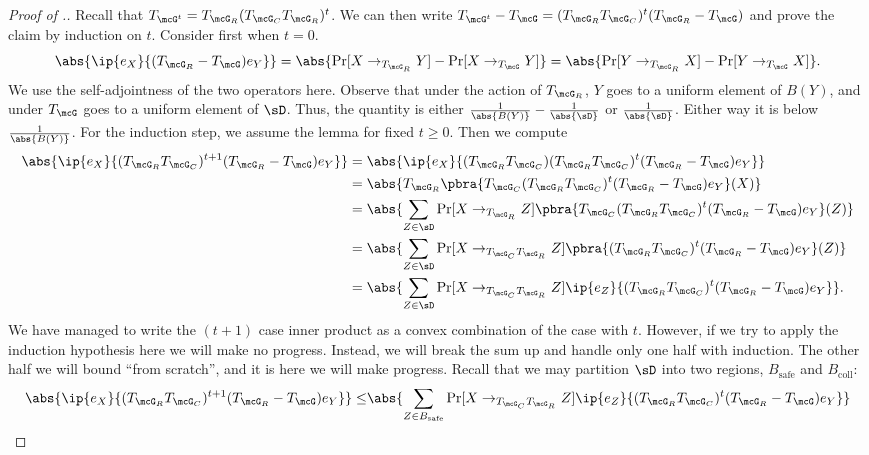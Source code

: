 \begin{proof}[Proof of .]
Recall that $T_{\mcG^t} = T_{\mcG_R}(T_{\mcG_C}T_{\mcG_R})^t$. We can then write $T_{\mcG^t}-T_{\mcG} = (T_{\mcG_R}T_{\mcG_C})^t(T_{\mcG_R} - T_\mcG)$ and prove the claim by induction on $t$. Consider first when $t = 0$.
\begin{equation*}
    \abs{\ip{e_X}{(T_{\mcG_R}-T_{\mcG}) e_Y}} = \abs{\Pr[X \to_{T_{\mcG_R}} Y] - \Pr[X \to_{T_{\mcG}} Y]} = \abs{\Pr[Y \to_{T_{\mcG_R}} X] - \Pr[Y \to_{T_{\mcG}} X]}.
\end{equation*}
We use the self-adjointness of the two operators here. Observe that under the action of $T_{\mcG_R}$, $Y$ goes to a uniform element of $B(Y)$, and under $T_\mcG$ goes to a uniform element of $\sD$. Thus, the quantity is either $\frac{1}{\abs{B(Y)}} - \frac{1}{\abs{\sD}}$ or $\frac{1}{\abs{\sD}}$. Either way it is below $\frac{1}{\abs{B(Y)}}$. For the induction step, we assume the lemma for fixed $t \geq 0$. Then we compute
\begin{align*}
    \abs{\ip{e_X}{(T_{\mcG_R}T_{\mcG_C})^{t+1}(T_{\mcG_R}-T_{\mcG}) e_Y}} &= \abs{\ip{e_X}{(T_{\mcG_R}T_{\mcG_C})(T_{\mcG_R}T_{\mcG_C})^t(T_{\mcG_R}-T_{\mcG}) e_Y}}\\
    &= \abs{T_{\mcG_R}\pbra{T_{\mcG_C}(T_{\mcG_R}T_{\mcG_C})^t(T_{\mcG_R}-T_{\mcG}) e_Y}(X)}\\
    &= \abs{\sum_{Z \in \sD} \Pr[X \to_{T_{\mcG_R}} Z]\pbra{T_{\mcG_C}(T_{\mcG_R}T_{\mcG_C})^t(T_{\mcG_R}-T_{\mcG}) e_Y}(Z)}\\
    &= \abs{\sum_{Z \in \sD} \Pr[X \to_{T_{\mcG_C}T_{\mcG_R}} Z]\pbra{(T_{\mcG_R}T_{\mcG_C})^t(T_{\mcG_R}-T_{\mcG}) e_Y}(Z)}\\
    &= \abs{\sum_{Z \in \sD} \Pr[X \to_{T_{\mcG_C}T_{\mcG_R}} Z] \ip{e_Z}{(T_{\mcG_R}T_{\mcG_C})^t(T_{\mcG_R}-T_{\mcG}) e_Y}}.
\end{align*}
We have managed to write the $(t+1)$ case inner product as a convex combination of the case with $t$. However, if we try to apply the induction hypothesis here we will make no progress. Instead, we will break the sum up and handle only one half with induction. The other half we will bound ``from scratch'', and it is here we will make progress. Recall that we may partition $\sD$ into two regions, $B_\text{safe}$ and $B_\text{coll}$:
\begin{align*}
    \abs{\ip{e_X}{(T_{\mcG_R}T_{\mcG_C})^{t+1}(T_{\mcG_R}-T_{\mcG}) e_Y}} \leq& \abs{\sum_{Z \in B_\text{safe}} \Pr[X \to_{T_{\mcG_C}T_{\mcG_R}} Z] \ip{e_Z}{(T_{\mcG_R}T_{\mcG_C})^t(T_{\mcG_R}-T_{\mcG}) e_Y}}\\

\end{align*}
\end{proof}
